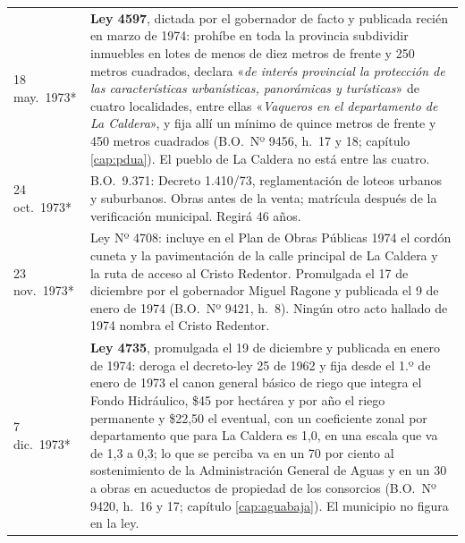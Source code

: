 \begin{longtable}{@{}p{2.7cm}p{10.3cm}@{}}
18 may.\ 1973* & \textbf{Ley 4597}, dictada por el gobernador de facto y publicada recién en marzo de 1974: prohíbe en toda la provincia subdividir inmuebles en lotes de menos de diez metros de frente y 250 metros cuadrados, declara «\textit{de interés provincial la protección de las características urbanísticas, panorámicas y turísticas}» de cuatro localidades, entre ellas «\textit{Vaqueros en el departamento de La Caldera}», y fija allí un mínimo de quince metros de frente y 450 metros cuadrados (B.O.\ Nº 9456, h.\ 17 y 18; capítulo \ref{cap:pdua}). El pueblo de La Caldera no está entre las cuatro. \\
24 oct.\ 1973* & B.O.\ 9.371: Decreto 1.410/73, reglamentación de loteos urbanos y suburbanos. Obras antes de la venta; matrícula después de la verificación municipal. Regirá 46 años. \\
23 nov.\ 1973* & Ley Nº 4708: incluye en el Plan de Obras Públicas 1974 el cordón cuneta y la pavimentación de la calle principal de La Caldera y la ruta de acceso al Cristo Redentor. Promulgada el 17 de diciembre por el gobernador Miguel Ragone y publicada el 9 de enero de 1974 (B.O.\ Nº 9421, h.\ 8). Ningún otro acto hallado de 1974 nombra el Cristo Redentor. \\
7 dic.\ 1973* & \textbf{Ley 4735}, promulgada el 19 de diciembre y publicada en enero de 1974: deroga el decreto-ley 25 de 1962 y fija desde el 1.º de enero de 1973 el canon general básico de riego que integra el Fondo Hidráulico, \$45 por hectárea y por año el riego permanente y \$22,50 el eventual, con un coeficiente zonal por departamento que para La Caldera es 1,0, en una escala que va de 1,3 a 0,3; lo que se perciba va en un 70 por ciento al sostenimiento de la Administración General de Aguas y en un 30 a obras en acueductos de propiedad de los consorcios (B.O.\ Nº 9420, h.\ 16 y 17; capítulo \ref{cap:aguabaja}). El municipio no figura en la ley. \\

\end{longtable}
